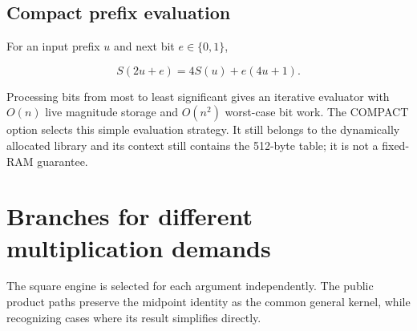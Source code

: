 \documentclass[11pt,a4paper]{article}
\begin{document}
\subsection{Compact prefix evaluation}

For an input prefix $u$ and next bit $e\in\{0,1\}$,

\[
S(2u+e)=4S(u)+e(4u+1).
\]

Processing bits from most to least significant gives an iterative evaluator with $O(n)$ live magnitude storage and $O(n^2)$ worst-case bit work. The COMPACT option selects this simple evaluation strategy. It still belongs to the dynamically allocated library and its context still contains the 512-byte table; it is not a fixed-RAM guarantee.

\section{Branches for different multiplication demands}

The square engine is selected for each argument independently. The public product paths preserve the midpoint identity as the common general kernel, while recognizing cases where its result simplifies directly.
\end{document}

